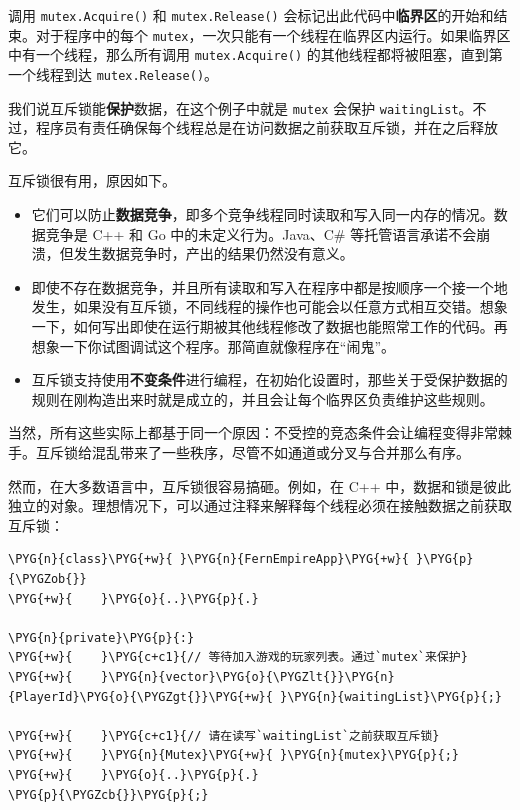 调用 \texttt{mutex.Acquire()} 和 \texttt{mutex.Release()} 会标记出此代码中\textbf{临界区}的开始和结束。对于程序中的每个 \texttt{mutex}，一次只能有一个线程在临界区内运行。如果临界区中有一个线程，那么所有调用 \texttt{mutex.Acquire()} 的其他线程都将被阻塞，直到第一个线程到达 \texttt{mutex.Release()}。

我们说互斥锁能\textbf{保护}数据，在这个例子中就是 \texttt{mutex} 会保护 \texttt{waitingList}。不过，程序员有责任确保每个线程总是在访问数据之前获取互斥锁，并在之后释放它。

互斥锁很有用，原因如下。

\begin{itemize}
\item 它们可以防止\textbf{数据竞争}，即多个竞争线程同时读取和写入同一内存的情况。数据竞争是 C++ 和 Go 中的未定义行为。Java、C\# 等托管语言承诺不会崩溃，但发生数据竞争时，产出的结果仍然没有意义。
\item 即使不存在数据竞争，并且所有读取和写入在程序中都是按顺序一个接一个地发生，如果没有互斥锁，不同线程的操作也可能会以任意方式相互交错。想象一下，如何写出即使在运行期被其他线程修改了数据也能照常工作的代码。再想象一下你试图调试这个程序。那简直就像程序在“闹鬼”。
\item 互斥锁支持使用\textbf{不变条件}进行编程，在初始化设置时，那些关于受保护数据的规则在刚构造出来时就是成立的，并且会让每个临界区负责维护这些规则。
\end{itemize}

当然，所有这些实际上都基于同一个原因：不受控的竞态条件会让编程变得非常棘手。互斥锁给混乱带来了一些秩序，尽管不如通道或分叉与合并那么有序。

然而，在大多数语言中，互斥锁很容易搞砸。例如，在 C++ 中，数据和锁是彼此独立的对象。理想情况下，可以通过注释来解释每个线程必须在接触数据之前获取互斥锁：

\begin{Verbatim}[commandchars=\\\{\},breaklines=true,breakanywhere=true,fontsize=\codefont,xleftmargin=17bp]
\PYG{n}{class}\PYG{+w}{ }\PYG{n}{FernEmpireApp}\PYG{+w}{ }\PYG{p}{\PYGZob{}}
\PYG{+w}{    }\PYG{o}{..}\PYG{p}{.}

\PYG{n}{private}\PYG{p}{:}
\PYG{+w}{    }\PYG{c+c1}{// 等待加入游戏的玩家列表。通过`mutex`来保护}
\PYG{+w}{    }\PYG{n}{vector}\PYG{o}{\PYGZlt{}}\PYG{n}{PlayerId}\PYG{o}{\PYGZgt{}}\PYG{+w}{ }\PYG{n}{waitingList}\PYG{p}{;}

\PYG{+w}{    }\PYG{c+c1}{// 请在读写`waitingList`之前获取互斥锁}
\PYG{+w}{    }\PYG{n}{Mutex}\PYG{+w}{ }\PYG{n}{mutex}\PYG{p}{;}
\PYG{+w}{    }\PYG{o}{..}\PYG{p}{.}
\PYG{p}{\PYGZcb{}}\PYG{p}{;}
\end{Verbatim}

